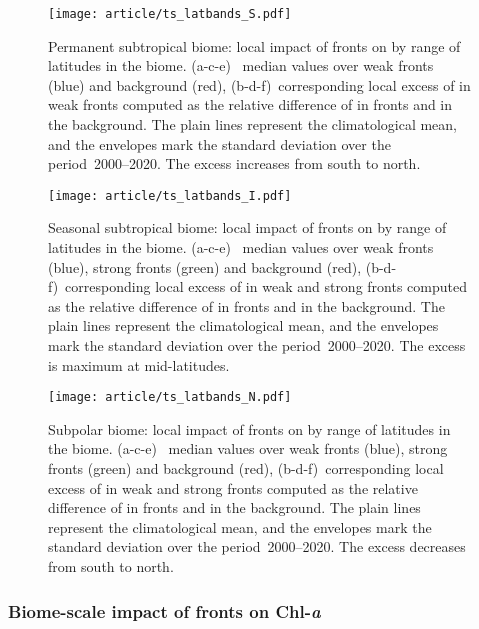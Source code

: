 \begin{figure}
  \centering
  \texttt{[image: article/ts\_latbands\_S.pdf]}
  \caption[Local impact of front on  in the permanent subtropical biome]{%
    Permanent subtropical biome: local impact of fronts on  by range of latitudes in the biome.
    (a-c-e)~ median values over weak fronts (blue) and background (red), (b-d-f)~corresponding local excess of  in weak fronts computed as the relative difference of  in fronts and in the background.
    The plain lines represent the climatological mean, and the envelopes mark the standard deviation over the period~2000--2020.
    The excess increases from south to north.
  }%
  \label{fig:latbands-s}
\end{figure}

\begin{figure}
  \centering
  \texttt{[image: article/ts\_latbands\_I.pdf]}
  \caption[Local impact of front on  in the seasonal subtropical biome]{%
    Seasonal subtropical biome: local impact of fronts on   by range of latitudes in the biome.
    (a-c-e)~ median values over weak fronts (blue), strong fronts (green) and background (red), (b-d-f)~corresponding local excess of  in weak and strong fronts computed as the relative difference of  in fronts and in the background.
    The plain lines represent the climatological mean, and the envelopes mark the standard deviation over the period~2000--2020.
    The excess is maximum at mid-latitudes.
  }%
  \label{fig:latbands-i}
\end{figure}

\begin{figure}
  \centering
  \texttt{[image: article/ts\_latbands\_N.pdf]}
  \caption[Local impact of front on  in the subpolar biome]{
    Subpolar biome: local impact of fronts on   by range of latitudes in the biome.
    (a-c-e)~ median values over weak fronts (blue), strong fronts (green) and background (red), (b-d-f)~corresponding local excess of  in weak and strong fronts computed as the relative difference of  in fronts and in the background.
    The plain lines represent the climatological mean, and the envelopes mark the standard deviation over the period~2000--2020.
    The excess decreases from south to north.
  }%
  \label{fig:latbands-n}
\end{figure}


\subsubsection{Biome-scale impact of fronts on Chl-\emph{a}}

